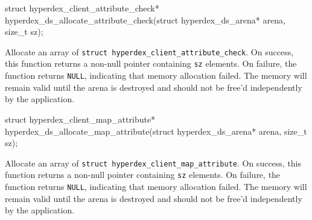 \funcsep
\begin{ccode}
struct hyperdex_client_attribute_check*
hyperdex_ds_allocate_attribute_check(struct hyperdex_ds_arena* arena, size_t sz);
\end{ccode}
\funcdesc Allocate an array of \texttt{struct hyperdex\_client\_attribute\_check}.
On success, this function returns a non-null pointer containing \texttt{sz}
elements.  On failure, the function returns \texttt{NULL}, indicating that
memory allocation failed.  The memory will remain valid until the arena is
destroyed and should not be free'd independently by the application.

\funcsep
\begin{ccode}
struct hyperdex_client_map_attribute*
hyperdex_ds_allocate_map_attribute(struct hyperdex_ds_arena* arena, size_t sz);
\end{ccode}
\funcdesc Allocate an array of \texttt{struct hyperdex\_client\_map\_attribute}.
On success, this function returns a non-null pointer containing \texttt{sz}
elements.  On failure, the function returns \texttt{NULL}, indicating that
memory allocation failed.  The memory will remain valid until the arena is
destroyed and should not be free'd independently by the application.

